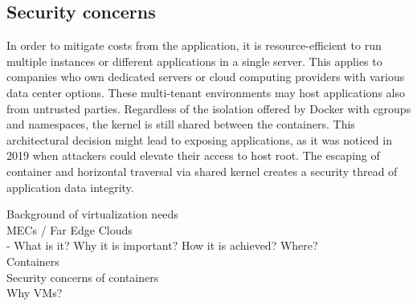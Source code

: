 \subsection{Security concerns}

In order to mitigate costs from the application, it is resource-efficient to run multiple instances or different applications in a single server. This applies to companies who own dedicated servers or cloud computing providers with various data center options. These multi-tenant environments may host applications also from untrusted parties. Regardless of the isolation offered by Docker with cgroups and namespaces, the kernel is still shared between the containers. This architectural decision might lead to exposing applications, as it was noticed in 2019 \cite{CVE-2019-5736} \cite{CVE-2020-14386} when attackers could elevate their access to host root. The escaping of container and horizontal traversal via shared kernel creates a security thread of application data integrity.



Background of virtualization needs \\
MECs / Far Edge Clouds \\
    - What is it? Why it is important? How it is achieved? Where? \\
Containers \\
Security concerns of containers \\
Why VMs? \\



